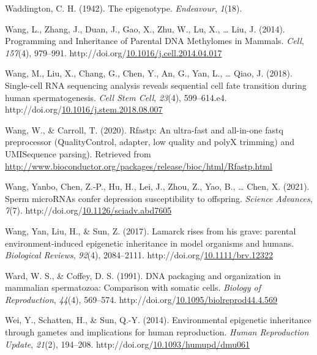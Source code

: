 \documentclass[12pt,twoside]{reedthesis}
\newlength{\cslhangindent}
\newenvironment{CSLReferences}[2] %
 {%
  \setlength{\parindent}{0pt}
  \ifodd #1 \everypar{\setlength{\hangindent}{\cslhangindent}}\ignorespaces\fi
  \ifnum #2 > 0
  \setlength{\parskip}{#2\baselineskip}
  \fi
 }%
 {}
\begin{document}
\begin{CSLReferences}{1}{0}
\leavevmode{}%
Waddington, C. H. (1942). The epigenotype. \emph{Endeavour}, \emph{1}(18).

\leavevmode{}%
Wang, L., Zhang, J., Duan, J., Gao, X., Zhu, W., Lu, X., \ldots{} Liu, J. (2014). Programming and Inheritance of Parental DNA Methylomes in Mammals. \emph{Cell}, \emph{157}(4), 979--991. http://doi.org/\href{https://doi.org/10.1016/j.cell.2014.04.017}{10.1016/j.cell.2014.04.017}

\leavevmode{}%
Wang, M., Liu, X., Chang, G., Chen, Y., An, G., Yan, L., \ldots{} Qiao, J. (2018). Single-cell RNA sequencing analysis reveals sequential cell fate transition during human spermatogenesis. \emph{Cell Stem Cell}, \emph{23}(4), 599--614.e4. http://doi.org/\href{https://doi.org/10.1016/j.stem.2018.08.007}{10.1016/j.stem.2018.08.007}

\leavevmode{}%
Wang, W., \& Carroll, T. (2020). Rfastp: An ultra-fast and all-in-one fastq preprocessor (QualityControl, adapter, low quality and polyX trimming) and UMISequence parsing). Retrieved from \url{http://www.bioconductor.org/packages/release/bioc/html/Rfastp.html}

\leavevmode{}%
Wang, Yanbo, Chen, Z.-P., Hu, H., Lei, J., Zhou, Z., Yao, B., \ldots{} Chen, X. (2021). Sperm {microRNAs} confer depression susceptibility to offspring. \emph{Science Advances}, \emph{7}(7). http://doi.org/\href{https://doi.org/10.1126/sciadv.abd7605}{10.1126/sciadv.abd7605}

\leavevmode{}%
Wang, Yan, Liu, H., \& Sun, Z. (2017). Lamarck rises from his grave: parental environment-induced epigenetic inheritance in model organisms and humans. \emph{Biological Reviews}, \emph{92}(4), 2084--2111. http://doi.org/\href{https://doi.org/10.1111/brv.12322}{10.1111/brv.12322}

\leavevmode{}%
Ward, W. S., \& Coffey, D. S. (1991). DNA packaging and organization in mammalian spermatozoa: Comparison with somatic cells. \emph{Biology of Reproduction}, \emph{44}(4), 569--574. http://doi.org/\href{https://doi.org/10.1095/biolreprod44.4.569}{10.1095/biolreprod44.4.569}

\leavevmode{}%
Wei, Y., Schatten, H., \& Sun, Q.-Y. (2014). Environmental epigenetic inheritance through gametes and implications for human reproduction. \emph{Human Reproduction Update}, \emph{21}(2), 194--208. http://doi.org/\href{https://doi.org/10.1093/humupd/dmu061}{10.1093/humupd/dmu061}


\end{CSLReferences}
\end{document}
